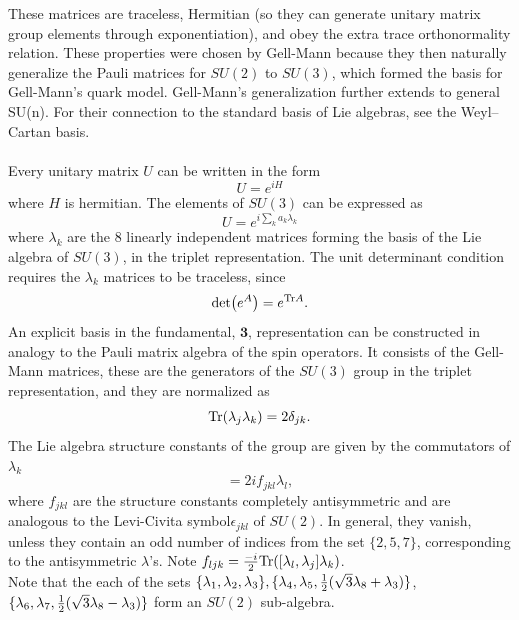 These matrices are traceless, Hermitian (so they can generate unitary matrix group elements through exponentiation), and obey the extra trace orthonormality relation. These properties were chosen by Gell-Mann because they then naturally generalize the Pauli matrices for $SU(2)$ to $SU(3)$, which formed the basis for Gell-Mann's quark model. Gell-Mann's generalization further extends to general SU(n). For their connection to the standard basis of Lie algebras, see the Weyl–Cartan basis.\\
\\
Every unitary matrix $U$ can be written in the form
\begin{equation*}
U=e^{iH}
\end{equation*}
where $H$ is hermitian. The elements of $SU(3)$ can be expressed as
\begin{equation*}
	U=e^{i \sum_k a_k \lambda_k}
\end{equation*}
where $\lambda_k$ are the $8$ linearly independent matrices forming the basis of the Lie algebra of $SU(3)$, in the triplet representation. The unit determinant condition requires the $\lambda_k$ matrices to be traceless, since
\begin{equation*}
\det(e^{A}) = e^{\mathrm{Tr} A}.
\end{equation*}
An explicit basis in the fundamental, $\mathbf{3}$, representation can be constructed in analogy to the Pauli matrix algebra of the spin operators. It consists of the Gell-Mann matrices, these are the generators of the $SU(3)$ group in the triplet representation, and they are normalized as
\begin{equation*}
	\mathrm{Tr}(\lambda_j \lambda_k) =2 \delta_{jk}.
\end{equation*}
The Lie algebra structure constants of the group are given by the commutators of $\lambda_k$
\begin{equation*}
	[\lambda_j,\lambda_k]= 2 i f_{jkl} \lambda_l,
\end{equation*}
where $f_{jkl}$ are the structure constants completely antisymmetric and are analogous to the Levi-Civita symbol$\epsilon_{jkl}$ of $SU(2)$. In general, they vanish, unless they contain an odd number of indices from the set $\{2,5,7\}$, corresponding to the antisymmetric $λ$'s. Note $f_{ljk} = \frac{-i}{2} \mathrm{Tr}([\lambda_l,\lambda_j] \lambda_k)$.\\
Note that the each of the sets $\{\lambda_1,\lambda_2,\lambda_3\},\{\lambda_4,\lambda_5,\frac{1}{2} (\sqrt{3}\lambda_8+\lambda_3)\}$,$\{\lambda_6,\lambda_7,\frac{1}{2} (\sqrt{3} \lambda_8-\lambda_3)\}$ form an $SU(2)$ sub-algebra.
